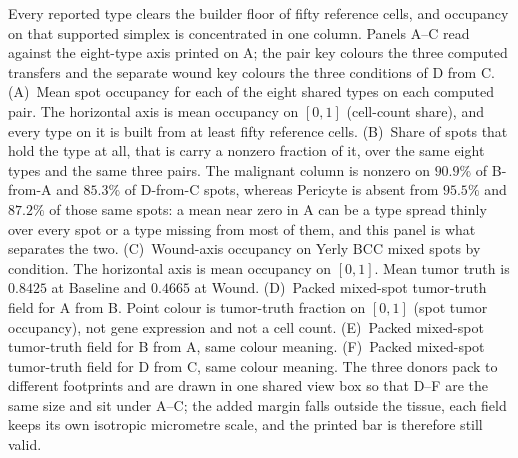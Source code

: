 Every reported type clears the builder floor of fifty reference cells, and occupancy on that supported simplex is concentrated in one column. Panels A--C read against the eight-type axis printed on A; the pair key colours the three computed transfers and the separate wound key colours the three conditions of D from C. (A)~Mean spot occupancy for each of the eight shared types on each computed pair. The horizontal axis is mean occupancy on \([0,1]\) (cell-count share), and every type on it is built from at least fifty reference cells. (B)~Share of spots that hold the type at all, that is carry a nonzero fraction of it, over the same eight types and the same three pairs. The malignant column is nonzero on \(90.9\%\) of B-from-A and \(85.3\%\) of D-from-C spots, whereas Pericyte is absent from \(95.5\%\) and \(87.2\%\) of those same spots: a mean near zero in A can be a type spread thinly over every spot or a type missing from most of them, and this panel is what separates the two. (C)~Wound-axis occupancy on Yerly BCC mixed spots by condition. The horizontal axis is mean occupancy on \([0,1]\). Mean tumor truth is \(0.8425\) at Baseline and \(0.4665\) at Wound. (D)~Packed mixed-spot tumor-truth field for A from B. Point colour is tumor-truth fraction on \([0,1]\) (spot tumor occupancy), not gene expression and not a cell count. (E)~Packed mixed-spot tumor-truth field for B from A, same colour meaning. (F)~Packed mixed-spot tumor-truth field for D from C, same colour meaning. The three donors pack to different footprints and are drawn in one shared view box so that D--F are the same size and sit under A--C; the added margin falls outside the tissue, each field keeps its own isotropic micrometre scale, and the printed bar is therefore still valid.
